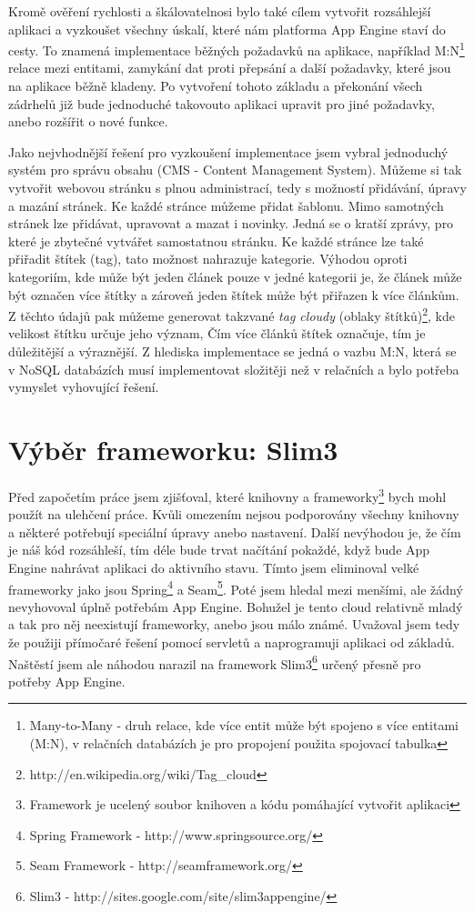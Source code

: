 Kromě ověření rychlosti a škálovatelnosi bylo také cílem vytvořit rozsáhlejší aplikaci a vyzkoušet všechny úskalí, které nám platforma App Engine staví do cesty. To znamená implementace běžných požadavků na aplikace, například M:N\footnote{Many-to-Many - druh relace, kde více entit může být spojeno s více entitami (M:N), v relačních databázích je pro propojení použita spojovací tabulka} relace mezi entitami, zamykání dat proti přepsání a další požadavky, které jsou na aplikace běžně kladeny. Po vytvoření tohoto základu a překonání všech zádrhelů již bude jednoduché takovouto aplikaci upravit pro jiné požadavky, anebo rozšířit o nové funkce.

Jako nejvhodnější řešení pro vyzkoušení implementace jsem vybral jednoduchý systém pro správu obsahu (CMS - Content Management System). Můžeme si tak vytvořit webovou  stránku s plnou administrací, tedy s možností přidávání, úpravy a mazání stránek. Ke každé stránce můžeme přidat šablonu. Mimo samotných stránek lze přidávat, upravovat a mazat i novinky. Jedná se o kratší zprávy, pro které je zbytečné vytvářet samostatnou stránku. Ke každé stránce lze také přiřadit štítek (tag), tato možnost nahrazuje kategorie. Výhodou oproti kategoriím, kde může být jeden článek pouze v jedné kategorii je, že článek může být označen více štítky a zároveň jeden štítek může být přiřazen k více článkům. Z těchto údajů pak můžeme generovat takzvané \emph{tag cloudy} (oblaky štítků)\footnote{http://en.wikipedia.org/wiki/Tag\_cloud}, kde velikost štítku určuje jeho význam, Čím více článků štítek označuje, tím je důležitější a výraznější. Z hlediska implementace se jedná o vazbu M:N, která se v NoSQL databázích musí implementovat složitěji než v relačních a bylo potřeba vymyslet vyhovující řešení.

\section{Výběr frameworku: Slim3}
Před započetím práce jsem zjišťoval, které knihovny a frameworky\footnote{Framework je ucelený soubor knihoven a kódu pomáhající vytvořit aplikaci} bych mohl použít na ulehčení práce. Kvůli omezením nejsou podporovány všechny knihovny a některé potřebují speciální úpravy anebo nastavení. Další nevýhodou je, že čím je náš kód rozsáhleší, tím déle bude trvat načítání pokaždé, když bude App Engine nahrávat aplikaci do aktivního stavu. Tímto jsem eliminoval velké frameworky jako jsou Spring\footnote{Spring Framework - http://www.springsource.org/} a Seam\footnote{Seam Framework - http://seamframework.org/}. Poté jsem hledal mezi menšími, ale žádný nevyhovoval úplně potřebám App Engine. Bohužel je tento cloud relativně mladý a tak pro něj neexistují frameworky, anebo jsou málo známé. Uvažoval jsem tedy že použiji přímočaré řešení pomocí servletů a naprogramuji aplikaci od základů. Naštěstí jsem ale náhodou narazil na framework Slim3\footnote{Slim3 - http://sites.google.com/site/slim3appengine/} určený přesně pro potřeby App Engine.

